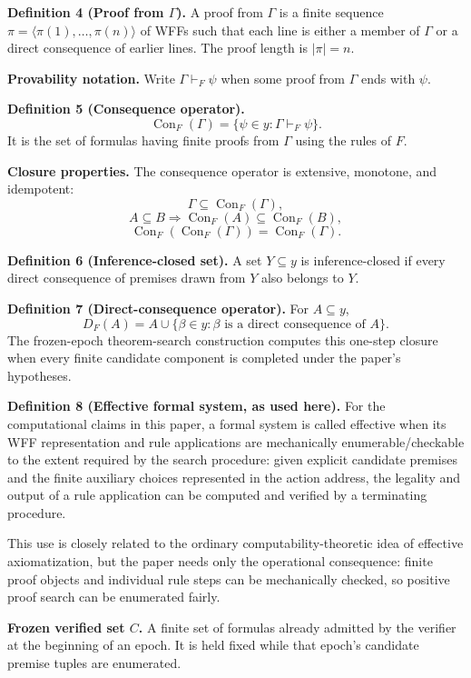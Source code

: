 \documentclass[11pt]{article}
\theoremstyle{hilberttheorem}
\begin{document}
\textbf{Definition 4 (Proof from $\Gamma$).} A proof from $\Gamma$ is a finite sequence $\pi=\langle\pi(1),\ldots,\pi(n)\rangle$ of WFFs such that each line is either a member of $\Gamma$ or a direct consequence of earlier lines. The proof length is $|\pi|=n$.

\textbf{Provability notation.} Write $\Gamma\vdash_F\psi$ when some proof from $\Gamma$ ends with $\psi$.

\textbf{Definition 5 (Consequence operator).}
\[
\operatorname{Con}_F(\Gamma)=\{\psi\in y:\Gamma\vdash_F\psi\}.
\]
It is the set of formulas having finite proofs from $\Gamma$ using the rules of $F$.

\textbf{Closure properties.} The consequence operator is extensive, monotone, and idempotent:
\[
\Gamma\subseteq\operatorname{Con}_F(\Gamma),
\]
\[
A\subseteq B\Longrightarrow\operatorname{Con}_F(A)\subseteq\operatorname{Con}_F(B),
\]
\[
\operatorname{Con}_F(\operatorname{Con}_F(\Gamma))=\operatorname{Con}_F(\Gamma).
\]

\textbf{Definition 6 (Inference-closed set).} A set $Y\subseteq y$ is inference-closed if every direct consequence of premises drawn from $Y$ also belongs to $Y$.

\textbf{Definition 7 (Direct-consequence operator).} For $A\subseteq y$,
\[
D_F(A)=A\cup\{\beta\in y:\beta\text{ is a direct consequence of }A\}.
\]
The frozen-epoch theorem-search construction computes this one-step closure when every finite candidate component is completed under the paper's hypotheses.

\textbf{Definition 8 (Effective formal system, as used here).} For the computational claims in this paper, a formal system is called effective when its WFF representation and rule applications are mechanically enumerable/checkable to the extent required by the search procedure: given explicit candidate premises and the finite auxiliary choices represented in the action address, the legality and output of a rule application can be computed and verified by a terminating procedure.

This use is closely related to the ordinary computability-theoretic idea of effective axiomatization, but the paper needs only the operational consequence: finite proof objects and individual rule steps can be mechanically checked, so positive proof search can be enumerated fairly.

\textbf{Frozen verified set $C$.} A finite set of formulas already admitted by the verifier at the beginning of an epoch. It is held fixed while that epoch's candidate premise tuples are enumerated.
\end{document}
